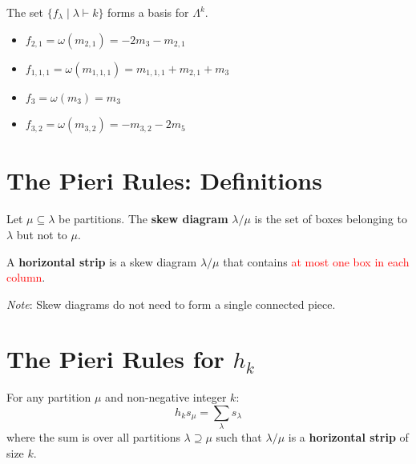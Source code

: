 \documentclass[12pt]{memoir}
\begin{document}
\begin{ptcb}
\begin{Prop}
The set $\{f_\lambda \mid \lambda \vdash k\}$ forms a basis for $\Lambda^k$.
\end{Prop}
\end{ptcb}

\begin{Ex}
\begin{itemize}
    \item $f_{2,1} = \omega(m_{2,1}) = -2m_3 - m_{2,1}$
    \item $f_{1,1,1} = \omega(m_{1,1,1}) = m_{1,1,1} + m_{2,1} + m_3$
    \item $f_3 = \omega(m_3) = m_3$
    \item $f_{3,2} = \omega(m_{3,2}) = -m_{3,2} - 2m_5$
\end{itemize}
\end{Ex}

\newpage

\section{The Pieri Rules: Definitions}

\begin{ptcb}
\begin{Def}
Let $\mu \subseteq \lambda$ be partitions. The \textbf{skew diagram} $\lambda / \mu$ is the set of boxes belonging to $\lambda$ but not to $\mu$.
\end{Def}
\end{ptcb}

\begin{ptcb}
\begin{Def}
A \textbf{horizontal strip} is a skew diagram $\lambda / \mu$ that contains \textcolor{red}{at most one box in each column}.
\end{Def}
\end{ptcb}

\textit{Note}: Skew diagrams do not need to form a single connected piece.

\newpage

\section{The Pieri Rules for \texorpdfstring{$h_k$}{h_k}}

\begin{ptcb}
\begin{Th}
For any partition $\mu$ and non-negative integer $k$:
\[
h_k s_\mu = \sum_{\lambda} s_\lambda
\]
where the sum is over all partitions $\lambda \supseteq \mu$ such that $\lambda / \mu$ is a \textbf{horizontal strip} of size $k$.
\end{Th}
\end{ptcb}
\end{document}
